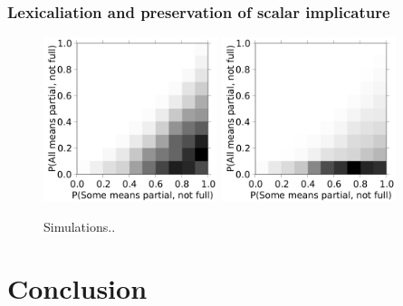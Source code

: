 \documentclass{article} %
\begin{document}
\subsubsection{Lexicaliation and preservation of scalar implicature}


\begin{figure}
\centering
\includegraphics[width=2in]{figures/some-all-only-pragmatic.pdf}
\includegraphics[width=2in]{figures/some-all-pragmatic+unambiguous.pdf}
\caption{\label{fig:scalar} Simulations..}
\end{figure}

\section{Conclusion}







\end{document}
